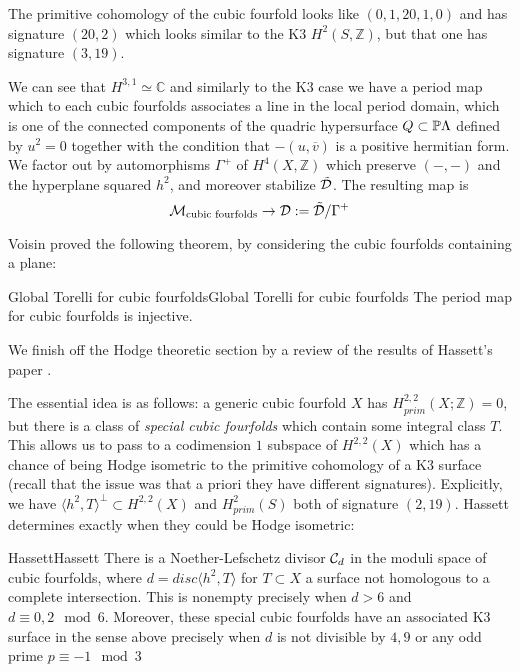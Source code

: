 The primitive cohomology of the cubic fourfold looks like $(0,1,20,1,0)$ and has signature $(20,2)$ which looks similar to the K3 $H^2(S,\mathbb{Z})$, but that one has signature $(3,19)$. 

We can see that $H^{3,1}\simeq \mathbb{C}$ and similarly to the K3 case we have a period map which to each cubic fourfolds associates a line in the local period domain, which is one of the connected components of the quadric hypersurface $Q\subset \P \Lambda$ defined by $u^2=0$ together with the condition that $-(u, \overline{v})$ is a positive hermitian form. We factor out by automorphisms $\Gamma^+$ of $H^4(X,\mathbb{Z})$ which preserve $(-,-)$ and the hyperplane squared $h^2$, and moreover stabilize $\tilde{\calD}$. The resulting map is $$\mathcal{M}_{\text{cubic fourfolds}}\rightarrow \calD : = \tilde{\calD}/\Gamma^+$$

Voisin \cite{voisin_theoreme_2008} proved the following theorem, by considering the cubic fourfolds containing a plane:

\begin{theorem}{Global Torelli for cubic fourfolds}{Global Torelli for cubic fourfolds}
    The period map for cubic fourfolds is injective.
\end{theorem}

We finish off the Hodge theoretic section by a review of the results of Hassett's paper \cite{hassett_special_2000}. 

The essential idea is as follows: a generic cubic fourfold $X$ has $H^{2,2}_{prim}(X;\mathbb{Z})=0$, but there is a class of \emph{special cubic fourfolds} which contain some integral class $T$. This allows us to pass to a codimension $1$ subspace of $H^{2,2}(X)$ which has a chance of being Hodge isometric to the primitive cohomology of a K3 surface (recall that the issue was that a priori they have different signatures). Explicitly, we have $\langle h^2, T\rangle ^\perp \subset H^{2,2}(X)$ and $H^2_{prim}(S)$ both of signature $(2,19)$. Hassett determines exactly when they could be Hodge isometric:

\begin{theorem}{Hassett}{Hassett}
    There is a Noether-Lefschetz divisor $\calC_d$ in the moduli space of cubic fourfolds, where $d=disc\langle h^2, T\rangle$ for $T\subset X$ a surface not homologous to a complete intersection. This is nonempty precisely when $d>6$ and $d\equiv 0,2 \mod 6$. Moreover, these special cubic fourfolds have an associated K3 surface in the sense above precisely when $d$ is not divisible by $4,9$ or any odd prime $p\equiv -1 \mod 3$
\end{theorem}

